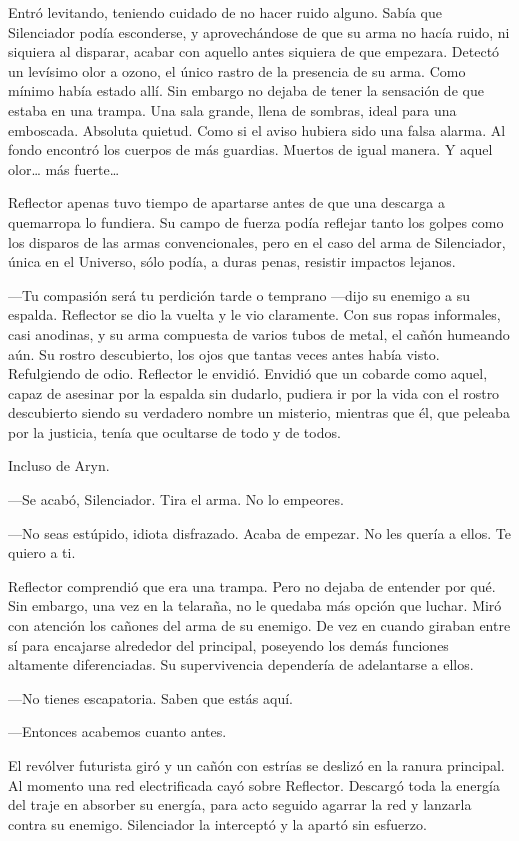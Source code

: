 Entró levitando, teniendo cuidado de no hacer ruido alguno. Sabía que Silenciador podía esconderse, y aprovechándose de que su arma no hacía ruido, ni siquiera al disparar, acabar con aquello antes siquiera de que empezara. Detectó un levísimo olor a ozono, el único rastro de la presencia de su arma. Como mínimo había estado allí. Sin embargo no dejaba de tener la sensación de que estaba en una trampa. Una sala grande, llena de sombras, ideal para una emboscada. Absoluta quietud. Como si el aviso hubiera sido una falsa alarma. Al fondo encontró los cuerpos de más guardias. Muertos de igual manera. Y aquel olor\dots{} más fuerte\dots

Reflector apenas tuvo tiempo de apartarse antes de que una descarga a quemarropa lo fundiera. Su campo de fuerza podía reflejar tanto los golpes como los disparos de las armas convencionales, pero en el caso del arma de Silenciador, única en el Universo, sólo podía, a duras penas, resistir impactos lejanos.

---Tu compasión será tu perdición tarde o temprano ---dijo su enemigo a su espalda. Reflector se dio la vuelta y le vio claramente. Con sus ropas informales, casi anodinas, y su arma compuesta de varios tubos de metal, el cañón humeando aún. Su rostro descubierto, los ojos que tantas veces antes había visto. Refulgiendo de odio. Reflector le envidió. Envidió que un cobarde como aquel, capaz de asesinar por la espalda sin dudarlo, pudiera ir por la vida con el rostro descubierto siendo su verdadero nombre un misterio, mientras que él, que peleaba por la justicia, tenía que ocultarse de todo y de todos.

Incluso de Aryn.

---Se acabó, Silenciador. Tira el arma. No lo empeores.

---No seas estúpido, idiota disfrazado. Acaba de empezar. No les quería a ellos. Te quiero a ti.

Reflector comprendió que era una trampa. Pero no dejaba de entender por qué. Sin embargo, una vez en la telaraña, no le quedaba más opción que luchar. Miró con atención los cañones del arma de su enemigo. De vez en cuando giraban entre sí para encajarse alrededor del principal, poseyendo los demás funciones altamente diferenciadas. Su supervivencia dependería de adelantarse a ellos.

---No tienes escapatoria. Saben que estás aquí.

---Entonces acabemos cuanto antes.

El revólver futurista giró y un cañón con estrías se deslizó en la ranura principal. Al momento una red electrificada cayó sobre Reflector. Descargó toda la energía del traje en absorber su energía, para acto seguido agarrar la red y lanzarla contra su enemigo. Silenciador la interceptó y la apartó sin esfuerzo.

